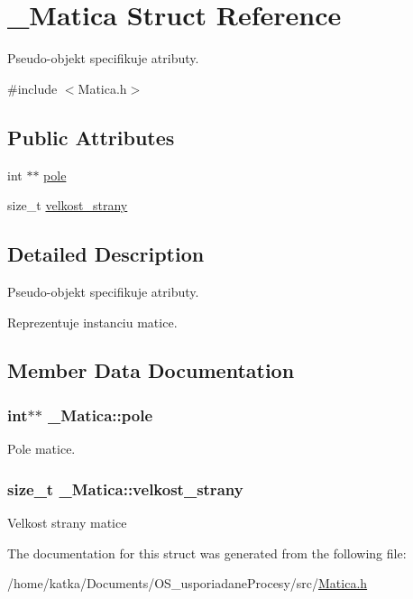 \hypertarget{struct__Matica}{}\section{\+\_\+\+Matica Struct Reference}
\label{struct__Matica}


Pseudo-\/objekt specifikuje atributy.  




{\ttfamily \#include $<$Matica.\+h$>$}

\subsection*{Public Attributes}
\begin{DoxyCompactItemize}
\item 
int $\ast$$\ast$ \hyperlink{struct__Matica_ac3fca0017962cbf096d0e50b54c640b0}{pole}
\item 
size\+\_\+t \hyperlink{struct__Matica_a089eec293e9332883a0a8963043ae869}{velkost\+\_\+strany}
\end{DoxyCompactItemize}


\subsection{Detailed Description}
Pseudo-\/objekt specifikuje atributy. 

Reprezentuje instanciu matice. 

\subsection{Member Data Documentation}
\subsubsection[{\texorpdfstring{pole}{pole}}]{\setlength{\rightskip}{0pt plus 5cm}int$\ast$$\ast$ \+\_\+\+Matica\+::pole}\hypertarget{struct__Matica_ac3fca0017962cbf096d0e50b54c640b0}{}\label{struct__Matica_ac3fca0017962cbf096d0e50b54c640b0}
Pole matice. 
\subsubsection[{\texorpdfstring{velkost\+\_\+strany}{velkost_strany}}]{\setlength{\rightskip}{0pt plus 5cm}size\+\_\+t \+\_\+\+Matica\+::velkost\+\_\+strany}\hypertarget{struct__Matica_a089eec293e9332883a0a8963043ae869}{}\label{struct__Matica_a089eec293e9332883a0a8963043ae869}
Velkost strany matice 

The documentation for this struct was generated from the following file\+:\begin{DoxyCompactItemize}
\item 
/home/katka/\+Documents/\+O\+S\+\_\+usporiadane\+Procesy/src/\hyperlink{Matica_8h}{Matica.\+h}\end{DoxyCompactItemize}
